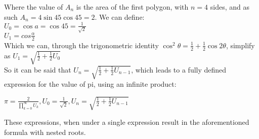 Where the value of $A_{n}$ is the area of the first polygon, with $n=4$ sides, and as such 
$A_{n} = 4 \sin{45} \cos{45} = 2$. We can define: \\
$U_{0} = \cos{a} = \cos{45} = \frac{1}{\sqrt{2}}$ \\
$U_{1} = cos{\frac{\alpha}{2}}$ \\
Which we can, through the trigonometric identity 
$\cos^2{\theta} = \frac{1}{2} + \frac{1}{2} \cos{2\theta}$, simplify as
$U_{1} = \sqrt{\frac{1}{2} + \frac{1}{2} U_{0}}$ \\
So it can be said that $U_{n} = \sqrt{\frac{1}{2} + \frac{1}{2} U_{n - 1}}$, which leads to 
a fully defined expression for the value of pi, using an infinite product: 

$\pi = \frac{2}{\prod\limits_{k=0}^\infty U_{k}}, U_{0} = \frac{1}{\sqrt{2}}, U_{n} = \sqrt{\frac{1}{2} + \frac{1}{2} U_{n - 1}}$ \footnotemark

These expressions, when under a single expression result in the aforementioned 
formula with nested roots.  



